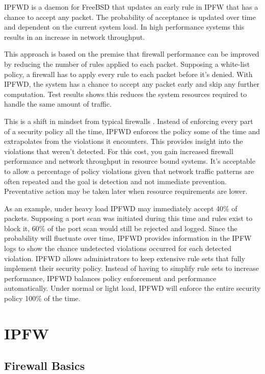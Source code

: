 \documentclass[journal]{IEEEtran}
\begin{document}
  IPFWD is a daemon for FreeBSD that updates an early rule in IPFW that has a
  chance to accept any packet. The probability of acceptance is updated over
  time and dependent on the current system load. In high performance systems
  this results in an increase in network throughput.

  This approach is based on the premise that firewall performance can be
  improved by reducing the number of rules applied to each packet. Supposing a
  white-list policy, a firewall has to apply every rule to each packet before
  it's denied.  With IPFWD, the system has a chance to accept any packet early
  and skip any further computation. Test results shows this reduces the system
  resources required to handle the same amount of traffic.

  This is a shift in mindset from typical firewalls \cite{networksecurity}.
  Instead of enforcing every part of a security policy all the time, IPFWD
  enforces the policy some of the time and extrapolates from the violations it
  encounters.  This provides insight into the violations that weren't detected.
  For this cost, you gain increased firewall performance and network throughput
  in resource bound systems. It's acceptable to allow a percentage of policy
  violations given that network traffic patterns are often repeated and the
  goal is detection and not immediate prevention. Preventative action may be
  taken later when resource requirements are lower.

  As an example, under heavy load IPFWD may immediately accept 40\% of packets.
  Supposing a port scan was initiated during this time and rules exist to block
  it, 60\% of the port scan would still be rejected and logged. Since the
  probability will fluctuate over time, IPFWD provides information in the IPFW
  logs to show the chance undetected violations occurred for each detected
  violation. IPFWD allows administrators to keep extensive rule sets that fully
  implement their security policy. Instead of having to simplify rule sets to
  increase performance, IPFWD balances policy enforcement and performance
  automatically. Under normal or light load, IPFWD will enforce the entire
  security policy 100\% of the time.

\section{IPFW}

  \subsection{Firewall Basics}
\end{document}
